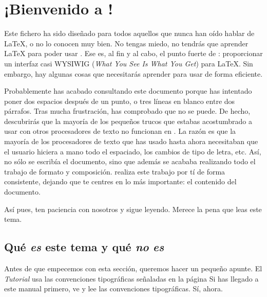 

\section{¡Bienvenido a \LyX{}!}

Este fichero ha sido diseñado para todos aquellos que nunca han oído
hablar de \LaTeX{}, o no lo conocen muy bien. No tengas miedo, no
tendrás que aprender \LaTeX{} para poder usar \LyX{}. Ese es, al fin
y al cabo, el punto fuerte de \LyX{}: proporcionar un interfaz casi
WYSIWIG (\emph{What You See Is What You Get}) para \LaTeX{}. Sin embargo,
hay algunas cosas que necesitarás aprender para usar \LyX{} de forma
eficiente.

Probablemente has acabado consultando este documento porque has intentado
poner dos espacios después de un punto, o tres líneas en blanco entre
dos párrafos. Tras mucha frustración, has comprobado que no se puede.
De hecho, descubrirás que la mayoría de los pequeños trucos que estabas
acostumbrado a usar con otros procesadores de texto no funcionan en
\LyX{}. La razón es que la mayoría de los procesadores de texto que
has usado hasta ahora necesitaban que el usuario hiciera a mano todo
el espaciado, los cambios de tipo de letra, etc. Así, no sólo se escribía
el documento, sino que además se acababa realizando todo el trabajo
de formato y composición. \LyX{} realiza este trabajo por tí de forma
consistente, dejando que te centres en lo más importante: el contenido
del documento.

Así pues, ten paciencia con nosotros y sigue leyendo. Merece la pena
que leas este tema.


\subsection{Qué \emph{es} este tema y qué \emph{no} \emph{es}}

Antes de  que empecemos  con esta sección,  queremos hacer  un pequeño
apunte. El \emph{Tutorial} usa las convenciones tipográficas señaladas
en la página \pageref{convenciones_tipograficas} Si has llegado a este
manual primero, ve y lee las convenciones tipográficas. Sí, ahora.

